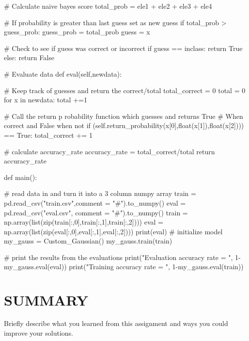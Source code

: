 \documentclass{article}
\begin{document}
\begin{flushleft}
\begin{python}
                                # Calculate naive bayes score
                                total_prob = ele1 + ele2 + ele3 + ele4
                        
                                # If probability is greater than last guess set as new guess
                                if total_prob > guess_prob:
                                        guess_prob = total_prob
                                        guess = x
                        
                        # Check to see if guess was correct or incorrect
                        if guess == inclass:
                                return True
                        else:
                                return False
                
                # Evaluate data
                def eval(self,newdata):
                        
                        # Keep track of guesses and return the correct/total
                        total_correct = 0
                        total = 0
                        for x in newdata:
                                total +=1

                                # Call the return p robability function which guesses and returns True 
                                # When correct and False when not
                                if (self.return_probability(x[0],float(x[1]),float(x[2]))) == True:
                                        total_correct += 1

                        # calculate accuracy_rate
                        accuracy_rate = total_correct/total
                        return accuracy_rate
                
        def main():

        # read data in and turn it into a 3 column numpy array
        train = pd.read_csv("train.csv",comment = "#").to_numpy()
        eval = pd.read_csv("eval.csv", comment = "#").to_numpy()
        train = np.array(list(zip(train[:,0],train[:,1],train[:,2])))
        eval = np.array(list(zip(eval[:,0],eval[:,1],eval[:,2])))
        print(eval)
        # initialize model
        my_gauss = Custom_Gaussian()
        my_gauss.train(train)
        
        # print the results from the evaluations
        print("Evaluation accuracy rate = ", 1-my_gauss.eval(eval))
        print("Training accuracy rate = ", 1-my_gauss.eval(train))
\end{python}
\end{flushleft}
\section{SUMMARY}
\large{Briefly describe what you learned from this assignment and ways you could improve your solutions.}
\end{document}
